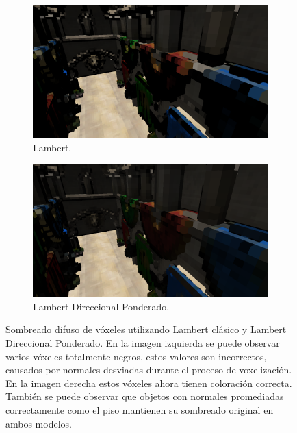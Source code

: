 \begin{figure}[H]
	\centering
	\begin{subfigure}[t]{0.49\textwidth}
		\centering
		\captionsetup{justification=centering}
		\includegraphics[width=\linewidth]{media/classic_lambert.png}
		\caption*{Lambert.}
	\end{subfigure}%
	\hspace{0.01\textwidth}
	\begin{subfigure}[t]{0.49\textwidth}
		\centering
		\captionsetup{justification=centering}
		\includegraphics[width=\linewidth]{media/dir_lambert.png}
		\caption*{Lambert Direccional Ponderado.}
	\end{subfigure}%
	\caption{Sombreado difuso de vóxeles utilizando Lambert clásico y Lambert Direccional Ponderado. En la imagen izquierda se puede observar varios vóxeles totalmente negros, estos valores son incorrectos, causados por normales desviadas durante el proceso de voxelización. En la imagen derecha estos vóxeles ahora tienen coloración correcta. También se puede observar que objetos con normales promediadas correctamente como el piso mantienen su sombreado original en ambos modelos.}
	\label{fig:lambert_dir_diff}
\end{figure}

